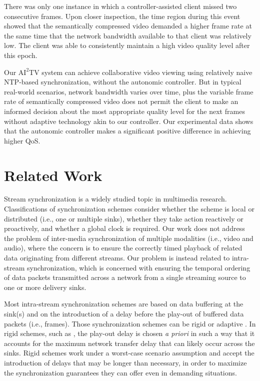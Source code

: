 \documentclass{sig-alternate}
\begin{document}
There was only one instance in which a controller-assisted client
missed two consecutive frames.  Upon closer inspection, the time
region during this event showed that the semantically compressed video
demanded a higher frame rate at the same time that the network
bandwidth available to that client was relatively low.  The client was
able to consistently maintain a high video quality level after this
epoch.

Our $\mathrm{AI}^2$TV system can achieve collaborative video viewing
using relatively naive NTP-based synchronization, without the
autonomic controller. But in typical real-world scenarios, network
bandwidth varies over time, plus the variable frame rate of
semantically compressed video does not permit the client to make an
informed decision about the most appropriate quality level for the
next frames without adaptive technology akin to our controller.  Our
experimental data shows that the autonomic controller makes a
significant positive difference in achieving higher QoS.

\section{Related Work} \label{related}

Stream synchronization is a widely studied topic in multimedia
research. Classifications of synchronization schemes consider whether
the scheme is local or distributed (i.e., one or multiple sinks),
whether they take action reactively or proactively, and whether a
global clock is required.  Our work does not address the problem of
inter-media synchronization of multiple modalities (i.e., video and
audio), where the concern is to ensure the correctly timed playback of
related data originating from different streams.  Our problem is
instead related to intra-stream synchronization, which is concerned
with ensuring the temporal ordering of data packets transmitted across
a network from a single streaming source to one or more delivery sinks.

Most intra-stream synchronization schemes are based on data buffering
at the sink(s) and on the introduction of a delay before the play-out
of buffered data packets (i.e., frames).  Those synchronization
schemes can be rigid or adaptive \cite{clark92supporting}.  In rigid schemes,
such as \cite{Ferrari}, the play-out delay is chosen {\it a priori} in
such a way that it accounts for the maximum network transfer delay
that can likely occur across the sinks.  Rigid schemes work under a
worst-case scenario assumption and accept the introduction of delays
that may be longer than necessary, in order to maximize the
synchronization guarantees they can offer even in demanding
situations.
\end{document}
